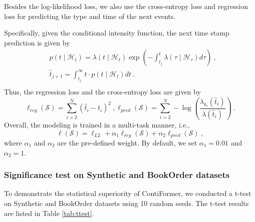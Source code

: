 Besides the log-likelihood loss, we also use the cross-entropy loss and regression loss for predicting the type and time of the next events.

Specifically, given the conditional intensity function, the next time stamp prediction is given by
\begin{equation}
\begin{aligned}
& p\left(t \mid \mathcal{H}_t\right)=\lambda\left(t \mid \mathcal{H}_t\right) \exp \left(-\int_{t_j}^t \lambda\left(\tau \mid \mathcal{H}_\tau\right) d \tau\right) ~, \\
& \widehat{t}_{j+1}=\int_{t_j}^{\infty} t \cdot p\left(t \mid \mathcal{H}_t\right) d t ~. \\
\end{aligned}
\end{equation}
Thus, the regression loss and the cross-entropy loss are given by
\begin{equation}
\ell_{reg}(\mathcal{S}) = \sum_{i=2}^{N} (\widehat{t}_{i} - t_i)^2 ~, 
\ell_{pred}(\mathcal{S}) = \sum_{i=2}^{N} -\log \left( \frac{\lambda_{k_i}\left(\widehat{t}_{i}\right)}{\lambda\left(\widehat{t}_{i} \right)} \right) ~.
\end{equation}
Overall, the modeling is trained in a multi-task manner, i.e., 
\begin{equation}
    \ell(\mathcal{S}) = \ell_{LL} + \alpha_1 \ell_{reg}(\mathcal{S}) + \alpha_2 \ell_{pred}(\mathcal{S}) ~,
\end{equation}
where $\alpha_1$ and $\alpha_2$ are the pre-defined weight. By default, we set $\alpha_1=0.01$ and $\alpha_2=1$.

\subsubsection{Significance test on Synthetic and BookOrder datasets}

To demonstrate the statistical superiority of ContiFormer, we conducted a t-test on Synthetic and BookOrder datasets using 10 random seeds. The t-test results are listed in Table \ref{tab:ttest}.

